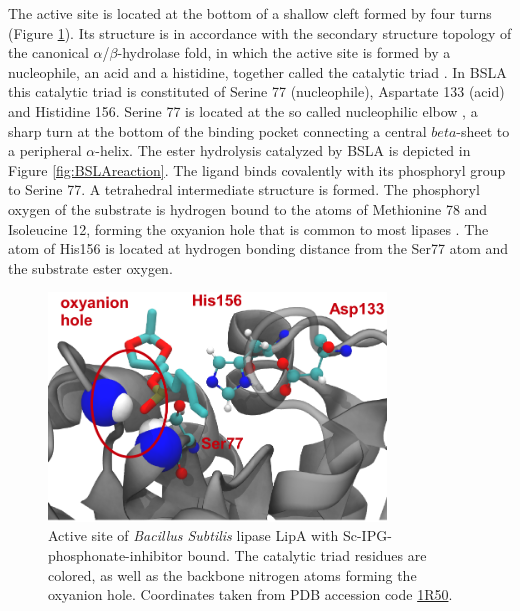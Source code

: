 \documentclass[english, a4paper, 12pt, titlepage, draft]{article}
\newcommand{\PDB}[1]{\href{http://pdb.rcsb.org/pdb/explore/explore.do?structureId=#1}{#1}}
\begin{document}
The active site is located at the bottom of a shallow cleft formed by four turns (Figure \ref{fig:BSLAactiveSite}).
Its structure is in accordance with the secondary structure topology of the canonical $\alpha$/$\beta$-hydrolase fold, in which the active site is formed by a nucleophile, an acid and a histidine, together called the catalytic triad \cite{BSLA_1I6W}.
In BSLA this catalytic triad is constituted of Serine 77 (nucleophile), Aspartate 133 (acid) and Histidine 156.
Serine 77 is located at the so called nucleophilic elbow \cite{nucleophileElbow}, a sharp turn at the bottom of the binding pocket connecting a central $beta$-sheet to a peripheral $\alpha$-helix.
The ester hydrolysis catalyzed by BSLA is depicted in Figure \ref{fig:BSLAreaction}.
The ligand binds covalently with its phosphoryl group to Serine 77.
A tetrahedral intermediate structure is formed.
The phosphoryl oxygen of the substrate is hydrogen bound to the  atoms of Methionine 78 and Isoleucine 12, forming the oxyanion hole that is common to most lipases \cite{BSLA_1I6W}.
The  atom of His156 is located at hydrogen bonding distance from the Ser77  atom and the substrate ester oxygen.






\begin{figure}
    \centering
    \includegraphics[width=0.8\textwidth]{figures/BSLA_pocket/BSLA_pocket_cartoon.pdf}
    \caption{Active site of \textit{Bacillus Subtilis} lipase LipA with Sc-IPG-phosphonate-inhibitor bound.
    The catalytic triad residues are colored, as well as the backbone nitrogen atoms forming the oxyanion hole.
    Coordinates taken from PDB accession code \PDB{1R50}.}
    \label{fig:BSLAactiveSite}
\end{figure} 
\end{document}
